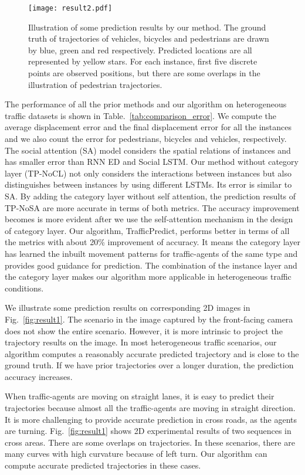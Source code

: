 \documentclass[letterpaper]{article} \usepackage{aaai19}  \usepackage{times}  \usepackage{helvet}  \usepackage{courier}  \usepackage{url}  \usepackage{graphicx}  \usepackage{amsmath}
\begin{document}
\begin{figure}
\texttt{[image: result2.pdf]}
\caption{Illustration of some prediction results by our method. The ground truth of trajectories of vehicles, bicycles and pedestrians are drawn by blue, green and red respectively. Predicted locations are all represented by yellow stars. For each instance, first five discrete points are observed positions, but there are some overlaps in the illustration of pedestrian trajectories. }
\label{fig:result2}
\vspace{-4ex}
\end{figure}

The performance of all the prior methods and our algorithm on heterogeneous traffic datasets is shown in Table.~\ref{tab:comparison_error}. We compute the average displacement error and the final displacement error for all the instances and we also count the error for pedestrians, bicycles and vehicles, respectively. The social attention (SA) model considers the spatial relations of instances and has smaller error than RNN ED and Social LSTM. Our method without category layer (TP-NoCL) not only considers the interactions between instances but also distinguishes between instances by using different LSTMs. Its error is similar to SA. By adding the category layer without self attention, the prediction results of TP-NoSA are more accurate in terms of both metrics. The accuracy improvement becomes is more evident after we use the self-attention mechanism in the design of category layer. Our algorithm, TrafficPredict, performs better in terms of all the metrics with about 20\% improvement of accuracy. It means the category layer has learned the inbuilt movement patterns for traffic-agents of the same type and provides good guidance for prediction. The combination of the instance layer and the category layer makes our algorithm more applicable in heterogeneous traffic conditions.

We illustrate some prediction results on corresponding 2D images in Fig.~\ref{fig:result1}. The scenario in the image captured by the front-facing camera does not show the entire scenario. However, it is more intrinsic to project the trajectory results on the image. In most  heterogeneous traffic scenarios, our algorithm computes a reasonably accurate predicted trajectory and is close to the ground truth. If we have prior trajectories over a longer duration, the prediction accuracy increases.


When traffic-agents are moving on straight lanes, it is easy to predict their trajectories because almost all the traffic-agents are moving in straight direction. It is more challenging to provide accurate prediction in cross roads, as the agents are turning. Fig.~\ref{fig:result1} shows 2D experimental results of two sequences in cross areas. There are some overlaps on trajectories. 
In these scenarios, there are many curves with high curvature because of left turn. Our algorithm can compute accurate predicted trajectories in these cases.  
\end{document}
